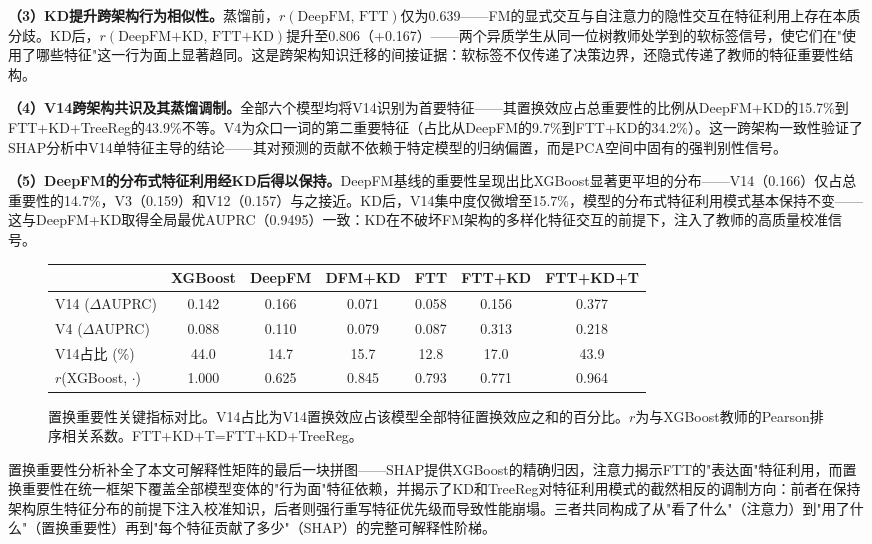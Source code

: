 \textbf{（3）KD提升跨架构行为相似性。}蒸馏前，$r(\text{DeepFM, FTT})$仅为0.639——FM的显式交互与自注意力的隐性交互在特征利用上存在本质分歧。KD后，$r(\text{DeepFM+KD, FTT+KD})$提升至0.806（+0.167）——两个异质学生从同一位树教师处学到的软标签信号，使它们在"使用了哪些特征"这一行为面上显著趋同。这是跨架构知识迁移的间接证据：软标签不仅传递了决策边界，还隐式传递了教师的特征重要性结构。

\textbf{（4）V14跨架构共识及其蒸馏调制。}全部六个模型均将V14识别为首要特征——其置换效应占总重要性的比例从DeepFM+KD的15.7\%到FTT+KD+TreeReg的43.9\%不等。V4为众口一词的第二重要特征（占比从DeepFM的9.7\%到FTT+KD的34.2\%）。这一跨架构一致性验证了SHAP分析中V14单特征主导的结论——其对预测的贡献不依赖于特定模型的归纳偏置，而是PCA空间中固有的强判别性信号。

\textbf{（5）DeepFM的分布式特征利用经KD后得以保持。}DeepFM基线的重要性呈现出比XGBoost显著更平坦的分布——V14（0.166）仅占总重要性的14.7\%，V3（0.159）和V12（0.157）与之接近。KD后，V14集中度仅微增至15.7\%，模型的分布式特征利用模式基本保持不变——这与DeepFM+KD取得全局最优AUPRC（0.9495）一致：KD在不破坏FM架构的多样化特征交互的前提下，注入了教师的高质量校准信号。

\begin{figure}[htbp]
    \centering
    \begin{tabular}{lcccccc}
    \toprule
    & \textbf{XGBoost} & \textbf{DeepFM} & \textbf{DFM+KD} & \textbf{FTT} & \textbf{FTT+KD} & \textbf{FTT+KD+T} \\
    \midrule
    V14 ($\Delta$AUPRC) & 0.142 & 0.166 & 0.071 & 0.058 & 0.156 & 0.377 \\
    V4 ($\Delta$AUPRC)  & 0.088 & 0.110 & 0.079 & 0.087 & 0.313 & 0.218 \\
    V14占比 (\%) & 44.0 & 14.7 & 15.7 & 12.8 & 17.0 & 43.9 \\
    \midrule
    $r$(XGBoost, $\cdot$) & 1.000 & 0.625 & 0.845 & 0.793 & 0.771 & 0.964 \\
    \bottomrule
    \end{tabular}
    \caption{置换重要性关键指标对比。V14占比为V14置换效应占该模型全部特征置换效应之和的百分比。$r$为与XGBoost教师的Pearson排序相关系数。FTT+KD+T=FTT+KD+TreeReg。}
    \label{fig:perm_importance_corr}
\end{figure}

置换重要性分析补全了本文可解释性矩阵的最后一块拼图——SHAP提供XGBoost的精确归因，注意力揭示FTT的"表达面"特征利用，而置换重要性在统一框架下覆盖全部模型变体的"行为面"特征依赖，并揭示了KD和TreeReg对特征利用模式的截然相反的调制方向：前者在保持架构原生特征分布的前提下注入校准知识，后者则强行重写特征优先级而导致性能崩塌。三者共同构成了从"看了什么"（注意力）到"用了什么"（置换重要性）再到"每个特征贡献了多少"（SHAP）的完整可解释性阶梯。

